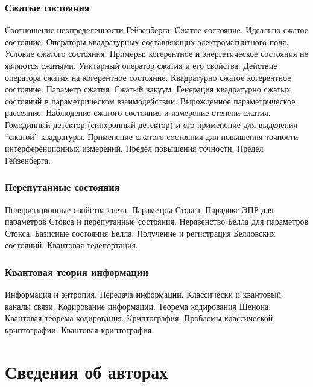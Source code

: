 \subsubsection{Сжатые состояния}
Соотношение неопределенности Гейзенберга. Сжатое состояние. Идеально
сжатое состояние. Операторы квадратурных составляющих
электромагнитного поля. Условие сжатого состояния. Примеры:
когерентное и энергетическое состояния не являются сжатыми. Унитарный
оператор сжатия и его свойства. Действие оператора сжатия на
когерентное состояние. Квадратурно сжатое когерентное
состояние. Параметр сжатия. Сжатый вакуум. Генерация квадратурно
сжатых состояний в параметрическом взаимодействии. Вырожденное
параметрическое рассеяние. Наблюдение сжатого состояния и измерение
степени сжатия. Гомодинный детектор (синхронный детектор) и его
применение для выделения ``сжатой'' квадратуры.  Применение сжатого
состояния для повышения точности интерференционных измерений. Предел
повышения точности. Предел Гейзенберга.
\subsubsection{Перепутанные состояния}
Поляризационные свойства света. Параметры Стокса. Парадокс ЭПР для параметров
  Стокса и перепутанные состояния. Неравенство Белла для параметров
  Стокса. Базисные состояния Белла. Получение и регистрация Белловских
  состояний. Квантовая телепортация.
\subsubsection{Квантовая теория информации}
Информация и энтропия. Передача информации. Классически и квантовый
каналы связи. Кодирование информации. Теорема кодирования
Шенона. Квантовая теорема кодирования. Криптография. Проблемы
классической криптографии. Квантовая криптография.

\section{Сведения об авторах}
